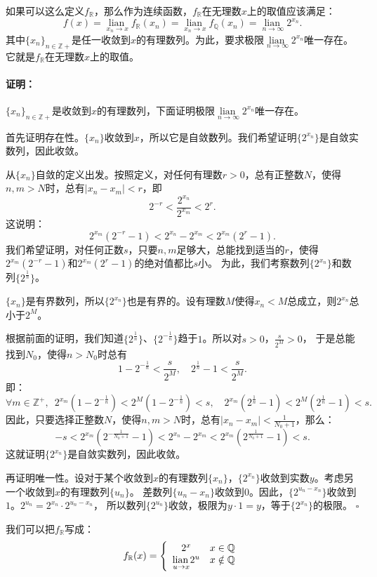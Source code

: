 \documentclass[12pt,UTF8]{ctexbook}
\newcommand{\lian}[1]{
    \underset{#1}{\operatorname{lian}\,}
}
\renewenvironment{proof}{\paragraph{\textbf{证明：}}}{\hfill$\square$}
\begin{document}
如果可以这么定义$f_{\mathbb{R}}$，那么作为连续函数，$f_{\mathbb{R}}$在无理数$x$上的取值应该满足：
$$  f(x) = \lian{x_n \to x}f_{\mathbb{R}}( x_n) = \lian{x_n \to x}f_{\mathbb{Q}}(x_n) = \lian{n \to \infty} 2^{x_n}. $$
其中$\{x_n\}_{n\in\mathbb{Z}+}$是任一收敛到$x$的有理数列。为此，要求极限$\lian{n \to \infty} 2^{x_n}$唯一存在。它就是$f_{\mathbb{R}}$在无理数$x$上的取值。

\begin{proof}
    $\{x_n\}_{n\in\mathbb{Z}+}$是收敛到$x$的有理数列，下面证明极限$\lian{n \to \infty} 2^{x_n}$唯一存在。

    首先证明存在性。$\{x_n\}$收敛到$x$，所以它是自敛数列。我们希望证明$\{2^{x_n}\}$是自敛实数列，因此收敛。

    从$\{x_n\}$自敛的定义出发。按照定义，对任何有理数$r>0$，总有正整数$N$，使得$n,m>N$时，总有$|x_n - x_m| < r$，即
    $$2^{-r} < \frac{2^{x_n}}{2^{x_m}} < 2^r.$$
    这说明：
    $$ 2^{x_m}(2^{-r} - 1) < 2^{x_n} - 2^{x_m} < 2^{x_m}(2^r - 1).$$
    我们希望证明，对任何正数$s$，只要$n,m$足够大，总能找到适当的$r$，使得$2^{x_m}(2^{-r} - 1)$和$2^{x_m}(2^r - 1)$的绝对值都比$s$小。
    为此，我们考察数列$\{2^{x_n}\}$和数列$\{2^{\frac{1}{n}}\}$。
    
    $\{x_n\}$是有界数列，所以$\{2^{x_n}\}$也是有界的。设有理数$M$使得$x_n < M$总成立，则$2^{x_n}$总小于$2^M$。
    
    根据前面的证明，我们知道$\{2^{\frac{1}{n}}\}$、$\{2^{-\frac{1}{n}}\}$趋于$1$。所以对$s>0$，$\frac{s}{2^M}>0$，
    于是总能找到$N_0$，使得$n>N_0$时总有
    $$ 1 - 2^{-\frac{1}{n}} < \frac{s}{2^M}, \quad 2^\frac{1}{n} - 1 < \frac{s}{2^M}. $$
    即：
    $$ \forall m\in\mathbb{Z}^+, \,\,\, 2^{x_m}(1 - 2^{-\frac{1}{n}}) < 2^M(1 - 2^{-\frac{1}{n}}) < s, \quad 2^{x_m}(2^\frac{1}{n} - 1) < 2^M(2^\frac{1}{n} - 1) < s. $$
    因此，只要选择正整数$N$，使得$n,m>N$时，总有$|x_n - x_m| < \frac{1}{N_0+1}$，那么：
    $$ -s < 2^{x_m}(2^{-\frac{1}{N_0+1}} - 1) < 2^{x_n} - 2^{x_m} < 2^{x_m}(2^\frac{1}{N_0+1} - 1) < s.$$
    这就证明$\{2^{x_n}\}$是自敛实数列，因此收敛。

    再证明唯一性。设对于某个收敛到$x$的有理数列$\{x_n\}$，$\{2^{x_n}\}$收敛到实数$y$。考虑另一个收敛到$x$的有理数列$\{u_n\}$。
    差数列$\{u_n - x_n\}$收敛到$0$。因此，$\{2^{u_n - x_n}\}$收敛到$1$。$2^{u_n} = 2^{x_n} \cdot 2^{u_n - x_n}$，
    所以数列$\{2^{u_n}\}$收敛，极限为$y \cdot 1 = y$，等于$\{2^{x_n}\}$的极限。
\end{proof}

我们可以把$f_{\mathbb{R}}$写成：
$$
    f_{\mathbb{R}} (x) = \left\{\begin{array}[]{cc}
        2^x & x\in\mathbb{Q} \\
        \lian{u \to x} 2^u & x \notin \mathbb{Q}
    \end{array}\right.
$$
\end{document}
